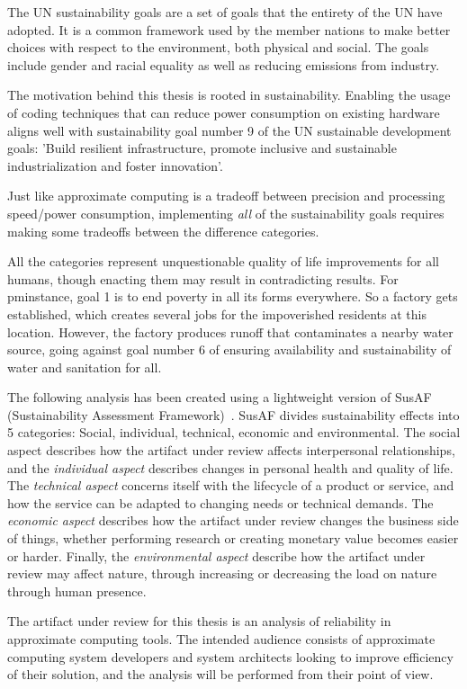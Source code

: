 
The UN sustainability goals are a set of goals that the entirety of the UN have adopted. It is a common framework used by the member nations to make better choices with respect to the environment, both physical and social. The goals include gender and racial equality as well as reducing emissions from industry.

The motivation behind this thesis is rooted in sustainability. Enabling the usage of coding techniques that can reduce power consumption on existing hardware aligns well with sustainability goal number 9 of the UN sustainable development goals: 'Build resilient infrastructure, promote inclusive and sustainable industrialization and foster innovation'. 

Just like approximate computing is a tradeoff between precision and processing speed/power consumption, implementing \emph{all} of the sustainability goals requires making some tradeoffs between the difference categories. 

All the categories represent unquestionable quality of life improvements for all humans, though enacting them may result in contradicting results. For pminstance, goal 1 is to end poverty in all its forms everywhere. So a factory gets established, which creates several jobs for the impoverished residents at this location. However, the factory produces runoff that contaminates a nearby water source, going against goal number 6 of ensuring availability and sustainability of water and sanitation for all. 

The following analysis has been created using a lightweight version of SusAF (Sustainability Assessment Framework)~\citep{SusAF_website}. SusAF divides sustainability effects into 5 categories: Social, individual, technical, economic and environmental. The social aspect describes how the artifact under review affects interpersonal relationships, and the \emph{individual aspect} describes changes in personal health and quality of life. The \emph{technical aspect} concerns itself with the lifecycle of a product or service, and how the service can be adapted to changing needs or technical demands. The \emph{economic aspect }describes how the artifact under review changes the business side of things, whether performing research or creating monetary value becomes easier or harder. Finally, the \emph{environmental aspect} describe how the artifact under review may affect nature, through increasing or decreasing the load on nature through human presence.

The artifact under review for this thesis is an analysis of reliability in approximate computing tools. The intended audience consists of approximate computing system developers and system architects looking to improve efficiency of their solution, and the analysis will be performed from their point of view. 


